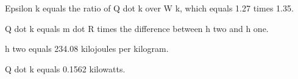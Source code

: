 Epsilon k equals the ratio of Q dot k over W k, which equals 1.27 times 1.35.

Q dot k equals m dot R times the difference between h two and h one.

h two equals 234.08 kilojoules per kilogram.

Q dot k equals 0.1562 kilowatts.